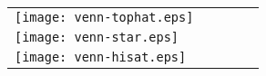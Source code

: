 \documentclass{minimal}
\begin{document}
\begin{tabular}{lllll}

	\begin{minipage}[b][][b]{10.0cm} {\centering \texttt{[image: venn-tophat.eps]}} \end{minipage}\\
	\begin{minipage}[b][][b]{10.0cm} {\centering \texttt{[image: venn-star.eps]}} \end{minipage}\\
	\begin{minipage}[b][][b]{10.0cm} {\centering \texttt{[image: venn-hisat.eps]}} \end{minipage}

\end{tabular}
\end{document}
